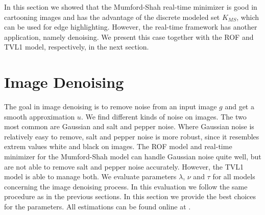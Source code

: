 \documentclass[abstracton]{scrreprt}
\begin{document}
        In this section we showed that the Mumford-Shah real-time minimizer is good in cartooning images and has the advantage of the discrete modeled set $K_{MS}$, which can be used for edge highlighting. However, the real-time framework has another application, namely denoising. We present this case together with the ROF and TVL1 model, respectively, in the next section.

    \section{Image Denoising} %
    \label{sec:image_denoising}
        
        The goal in image denoising is to remove noise from an input image $g$ and get a smooth approximation $u$. We find different kinds of noise on images. The two most common are Gaussian and salt and pepper noise. Where Gaussian noise is relatively easy to remove, salt and pepper noise is more robust, since it resembles extrem values white and black on images. The ROF model and real-time minimizer for the Mumford-Shah model can handle Gaussian noise quite well, but are not able to remove salt and pepper noise accurately. However, the TVL1 model is able to manage both. We evaluate parameters $\lambda$, $\nu$ and $\tau$ for all models concerning the image denoising process. In this evaluation we follow the same procedure as in the previous sections. In this section we provide the best choices for the parameters. All estimations can be found online at \cite{Bauer}.
\end{document}
